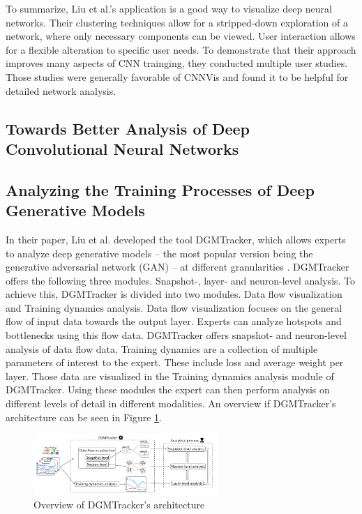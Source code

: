 \documentclass{acmsiggraph}               %
\begin{document}
To summarize, Liu et al.'s application is a good way to visualize deep neural networks. Their clustering techniques allow for a stripped-down exploration of a network, where only necessary components can be viewed. User interaction allows for a flexible alteration to specific user needs. To demonstrate that their approach improves many aspects of CNN trainging, they conducted multiple user studies. Those studies were generally favorable of CNNVis and found it to be helpful for detailed network analysis.

\subsection{Towards Better Analysis of Deep Convolutional Neural Networks}

\subsection{Analyzing the Training Processes of Deep Generative Models}
In their paper, Liu et al. developed the tool DGMTracker, which allows experts to analyze deep generative models -- the most popular version being the generative adversarial network (GAN) -- at different granularities \cite{Liu2018}. 
DGMTracker offers the following three modules. Snapshot-, layer- and neuron-level analysis.
To achieve this, DGMTracker is divided into two modules. Data flow visualization and Training dynamics analysis.
Data flow visualization focuses on the general flow of input data towards the output layer. Experts can analyze hotspots and bottlenecks using this flow data. DGMTracker offers snapshot- and neuron-level analysis of data flow data.
Training dynamics are a collection of multiple parameters of interest to the expert. These include loss and average weight per layer. Those data are visualized in the Training dynamics analysis module of DGMTracker.
Using these modules the expert can then perform analysis on different levels of detail in different modalities.
An overview if DGMTracker's architecture can be seen in Figure \ref{fig:mengchen1}.

\begin{figure}[!htb]
  \centering
  \includegraphics[width=2.75in]{mengchen1}
  \caption{Overview of DGMTracker's architecture \protect\cite{Liu2018}}
  \label{fig:mengchen1}
\end{figure}
\end{document}

